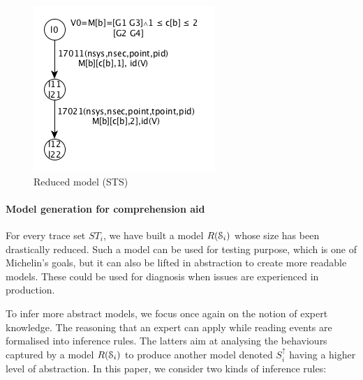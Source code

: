 \begin{figure}[H]
	\begin{center}
    \includegraphics[width=1.0\linewidth]{figures/STS2.png}
	\end{center}

	\caption{Reduced model (STS)}
	\label{fig:reduced-model}
\end{figure}

\paragraph{Model generation for comprehension aid}

For every trace set $ST_{i}$, we have built a model
$R(\EuScript{S}_i)$ whose size has been drastically reduced. Such
a model can be used for testing purpose, which is one of
Michelin's goals, but it can also be lifted in abstraction to
create more readable models. These could be used for diagnosis
when issues are experienced in production.

To infer more abstract models, we focus once again on the notion
of expert knowledge. The reasoning that an expert can apply while
reading events are formalised into inference rules. The latters
aim at analysing the behaviours captured by a model
$R(\EuScript{S}_i)$ to produce another model denoted
$S_{i}^\uparrow$ having a higher level of abstraction. In this
paper, we consider two kinds of inference rules:

